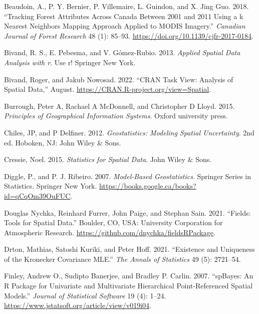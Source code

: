 \hypertarget{refs}{}
\begin{CSLReferences}{1}{0}
\leavevmode{}%
Beaudoin, A., P. Y. Bernier, P. Villemaire, L. Guindon, and X. Jing Guo. 2018. {``Tracking Forest Attributes Across Canada Between 2001 and 2011 Using a k Nearest Neighbors Mapping Approach Applied to MODIS Imagery.''} \emph{Canadian Journal of Forest Research} 48 (1): 85--93. \url{https://doi.org/10.1139/cjfr-2017-0184}.

\leavevmode{}%
Bivand, R. S., E. Pebesma, and V. Gómez-Rubio. 2013. \emph{Applied Spatial Data Analysis with r}. Use r! Springer New York.

\leavevmode{}%
Bivand, Roger, and Jakub Nowosad. 2022. {``CRAN Task View: Analysis of Spatial Data,''} August. \url{https://CRAN.R-project.org/view=Spatial}.

\leavevmode{}%
Burrough, Peter A, Rachael A McDonnell, and Christopher D Lloyd. 2015. \emph{Principles of Geographical Information Systems}. Oxford university press.

\leavevmode{}%
Chiles, JP, and P Delfiner. 2012. \emph{Geostatistics: Modeling Spatial Uncertainty}. 2nd ed. Hoboken, NJ: John Wiley \& Sons.

\leavevmode{}%
Cressie, Noel. 2015. \emph{Statistics for Spatial Data}. John Wiley \& Sons.

\leavevmode{}%
Diggle, P., and P. J. Ribeiro. 2007. \emph{Model-Based Geostatistics}. Springer Series in Statistics. Springer New York. \url{https://books.google.ca/books?id=qCqOm39OuFUC}.

\leavevmode{}%
Douglas Nychka, Reinhard Furrer, John Paige, and Stephan Sain. 2021. {``Fields: Tools for Spatial Data.''} Boulder, CO, USA: University Corporation for Atmospheric Research. \url{https://github.com/dnychka/fieldsRPackage}.

\leavevmode{}%
Drton, Mathias, Satoshi Kuriki, and Peter Hoff. 2021. {``Existence and Uniqueness of the Kronecker Covariance MLE.''} \emph{The Annals of Statistics} 49 (5): 2721--54.

\leavevmode{}%
Finley, Andrew O., Sudipto Banerjee, and Bradley P. Carlin. 2007. {``{spBayes}: An {R} Package for Univariate and Multivariate Hierarchical Point-Referenced Spatial Models.''} \emph{Journal of Statistical Software} 19 (4): 1--24. \url{https://www.jstatsoft.org/article/view/v019i04}.


\end{CSLReferences}
